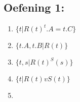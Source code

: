 \documentclass[../Oefenzitting5.tex]{subfiles}
\begin{document}
  \subsection{Oefening 1:}
    \begin{enumerate}
      \item

        $
          \{ t | R(t) ^ t.A = t.C \}
        $
      \item
        $
          \{ t.A, t.B | R(t) \}
        $
      \item
        $
          \{ t, s | R(t) ^ S(s)  \}
        $
      \item
        $
          \{ t | R(t) v S(t)  \}
        $
      \item
        $

        $


    \end{enumerate}
\end{document}
